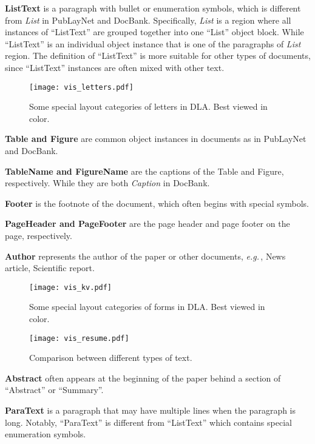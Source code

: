 \documentclass[10pt,twocolumn,letterpaper]{article}
\def\eg{\emph{e.g.}\,}
\begin{document}
\noindent
\textbf{ListText} is a paragraph with bullet or enumeration symbols,
which is different from \textit{List} in PubLayNet and DocBank.
Specifically,  \textit{List}  is a region where all instances of ``ListText''  are grouped together into one ``List'' object block.
While ``ListText'' is an individual object instance that is one of the paragraphs of \textit{List} region.
The definition of ``ListText'' is more suitable for other types of documents, 
since ``ListText'' instances are often mixed with other text.

\begin{figure}[t]\centering
\texttt{[image: vis\_letters.pdf]}
\caption{Some special layout categories of letters in DLA. Best viewed in color.}
 \label{fig:vis_letters}
\end{figure} 


\noindent
\textbf{Table  and Figure} are common object instances in documents as in PubLayNet and DocBank.

\noindent
\textbf{TableName  and FigureName} are the captions of the Table and Figure, respectively.
While they are both \textit{Caption} in DocBank. 

\noindent
\textbf{Footer} is the footnote of the document, which often begins with special symbols.

\noindent
\textbf{PageHeader and PageFooter} are the page header and page footer on the page, respectively.

\noindent
\textbf{Author} represents the author of the paper or other documents, \eg, News article, Scientific report.


\begin{figure*}[t]\centering
\texttt{[image: vis\_kv.pdf]}
\caption{Some special layout categories of forms in DLA. Best viewed in color.}
 \label{fig:vis_kv}
\end{figure*} 

\begin{figure}[!htp]\centering
\texttt{[image: vis\_resume.pdf]}
\caption{Comparison between different types of text.}
 \label{fig:vis_res}
\end{figure} 

\noindent
\textbf{Abstract} often appears at the beginning of the paper behind a section of ``Abstract'' or ``Summary''.

\noindent
\textbf{ParaText} is a paragraph that may have multiple lines when the paragraph is long.
Notably, ``ParaText'' is different from ``ListText'' which contains special enumeration symbols.
\end{document}
